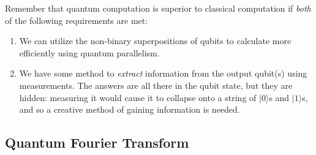\documentclass{article}
\begin{document}
    Remember that quantum computation is superior to classical computation if \textit{both} of the following requirements are met: 
    \begin{enumerate}
      \item We can utilize the non-binary superpositions of qubits to calculate more efficiently using quantum parallelism. 
      \item We have some method to \textit{extract} information from the output qubit(s) using measurements. The answers are all there in the qubit state, but they are hidden: measuring it would cause it to collapse onto a string of $|0\rangle$s and $|1\rangle$s, and so a creative method of gaining information is needed. 
    \end{enumerate}

\subsection{Quantum Fourier Transform} 
\end{document}

